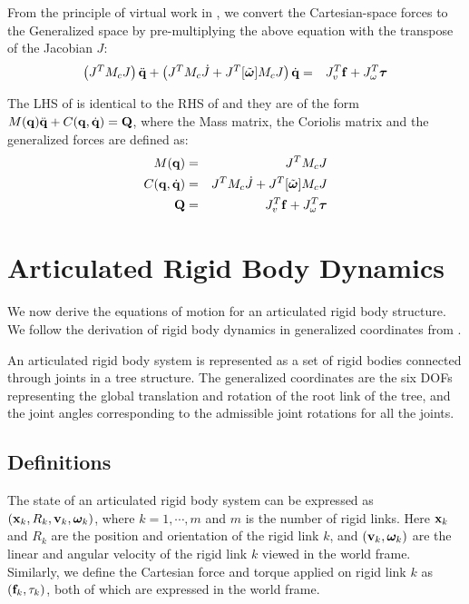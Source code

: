 From the principle of virtual work in , we convert the Cartesian-space forces to the Generalized space by pre-multiplying the above equation with the transpose of the Jacobian $J$:
\begin{eqnarray}
\label{eq:dyngen_vec2}
\left (J^T M_c J \right ) \ddot{\mathbf{q}} + \left (J^T M_c \dot{J} + J^T [\tilde{\bm{\omega}}]M_c J \right ) \dot{\mathbf{q}} & = & J_v^T \mathbf{f} + J_\omega^T \bm{\tau}
\end{eqnarray}

The LHS of  is identical to the RHS of  and they are of the form $M(\mathbf{q})\ddot{\mathbf{q}} + C(\mathbf{q},\dot{\mathbf{q}}) = \mathbf{Q}$, where the Mass matrix, the Coriolis matrix and the generalized forces are defined as:
\begin{eqnarray}
\nonumber
M(\mathbf{q}) & = & J^T M_c J\\
\nonumber
C(\mathbf{q},\dot{\mathbf{q}}) & = & J^T M_c \dot{J} + J^T [\tilde{\bm{\omega}}]M_c J\\
\mathbf{Q} & = & J_v^T \mathbf{f} + J_\omega^T \bm{\tau}
\end{eqnarray}

\section{Articulated Rigid Body Dynamics}
We now derive the equations of motion for an articulated rigid body structure. We follow the derivation of rigid body dynamics in generalized coordinates from .

An articulated rigid body system is represented as a set of rigid bodies connected through joints in a tree structure. The generalized coordinates are the six DOFs representing the global translation and rotation of the root link of the tree, and the joint angles corresponding to the admissible joint rotations for all the joints. 

\subsection{Definitions}
The state of an articulated rigid body
system can be expressed as $(\mathbf{x}_k, R_k, \mathbf{v}_k,
\boldsymbol{\bm{\omega}}_k)$, where $k = 1, \cdots, m$ and $m$ is the number of rigid links. Here $\mathbf{x}_k$ and
$R_k$ are the position and orientation of the rigid link $k$, and $(\mathbf{v}_k,
{\bm{\omega}}_k)$ are the linear and angular velocity of the
rigid link $k$ viewed in the world frame. Similarly, we define the
Cartesian force and torque applied on rigid link $k$ as $(\mathbf{f}_k,
{\tau}_k)$, both of which are expressed in the world
frame.

